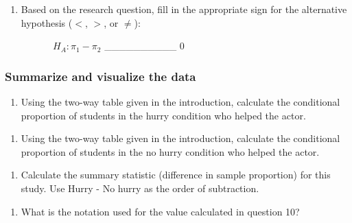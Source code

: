 \documentclass[
]{report}
\providecommand{\tightlist}{%
  \setlength{\itemsep}{0pt}\setlength{\parskip}{0pt}}
\begin{document}
\vspace{0.8in}

\begin{enumerate}
\def\labelenumi{\arabic{enumi}.}
\setcounter{enumi}{6}
\tightlist
\item
  Based on the research question, fill in the appropriate sign for the alternative hypothesis (\(<\), \(>\), or \(\neq\)):
  \vspace{0.1in}
\end{enumerate}

~~~~~~~~~~\(H_A: \pi_1 -\pi_2\) \_\_\_\_\_\_\_\_\_\_ 0

\hypertarget{summarize-and-visualize-the-data-1}{%
\subsubsection*{Summarize and visualize the data}\label{summarize-and-visualize-the-data-1}}

\begin{enumerate}
\def\labelenumi{\arabic{enumi}.}
\setcounter{enumi}{7}
\tightlist
\item
  Using the two-way table given in the introduction, calculate the conditional proportion of students in the hurry condition who helped the actor.
\end{enumerate}

\vspace{.3in}

\begin{enumerate}
\def\labelenumi{\arabic{enumi}.}
\setcounter{enumi}{8}
\tightlist
\item
  Using the two-way table given in the introduction, calculate the conditional proportion of students in the no hurry condition who helped the actor.
\end{enumerate}

\vspace{.3in}

\begin{enumerate}
\def\labelenumi{\arabic{enumi}.}
\setcounter{enumi}{9}
\tightlist
\item
  Calculate the summary statistic (difference in sample proportion) for this study. Use Hurry - No hurry as the order of subtraction.
\end{enumerate}

\vspace{0.4in}

\begin{enumerate}
\def\labelenumi{\arabic{enumi}.}
\setcounter{enumi}{10}
\tightlist
\item
  What is the notation used for the value calculated in question 10?
\end{enumerate}
\end{document}
